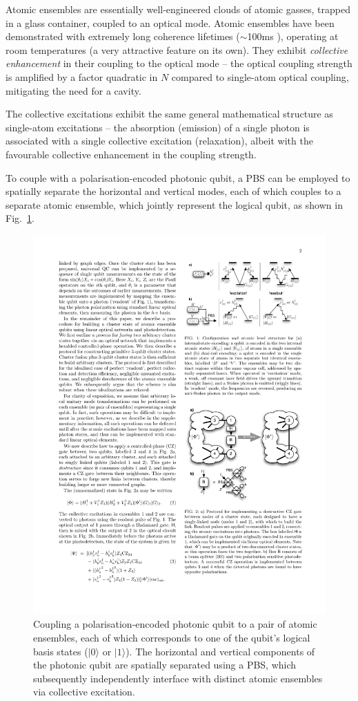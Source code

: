 \documentclass[aps,rmp,twocolumn,amsmath,amssymb,nofootinbib,superscriptaddress,longbibliography,floatfix,table-of-contents,eqsecnum]{revtex4-1}
\newcommand{\ket}[1]{|#1\rangle}
\newcommand{\comment}[1]{{\color{blue}{\textbf{#1}}}}
\begin{document}
Atomic ensembles are essentially well-engineered clouds of atomic gasses, trapped in a glass container, coupled to an optical mode. Atomic ensembles have been demonstrated with extremely long coherence lifetimes ($\sim$100ms \comment{Check this!}), operating at room temperatures (a very attractive feature on its own). They exhibit \textit{collective enhancement} in their coupling to the optical mode -- the optical coupling strength is amplified by a factor quadratic in $N$ compared to single-atom optical coupling, mitigating the need for a cavity.

The collective excitations exhibit the same general mathematical structure as single-atom excitations -- the absorption (emission) of a single photon is associated with a single collective excitation (relaxation), albeit with the favourable collective enhancement in the coupling strength.

To couple with a polarisation-encoded photonic qubit, a PBS can be employed to spatially separate the horizontal and vertical modes, each of which couples to a separate atomic ensemble, which jointly represent the logical qubit, as shown in Fig.~\ref{fig:atomic_ensemble_qubit}.

\begin{figure}[!htb]
\includegraphics[width=0.45\columnwidth]{atomic_ensemble_qubit}
\caption{Coupling a polarisation-encoded photonic qubit to a pair of atomic ensembles, each of which corresponds to one of the qubit's logical basis states ($\ket{0}$ or $\ket{1}$). The horizontal and vertical components of the photonic qubit are spatially separated using a PBS, which subsequently independently interface with distinct atomic ensembles via collective excitation.} \label{fig:atomic_ensemble_qubit}
\end{figure}
\end{document}
